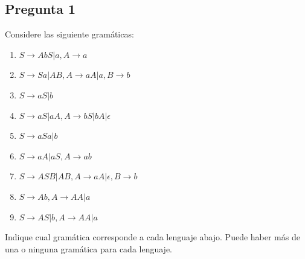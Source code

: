 \documentclass{article}
\begin{document}
	\subsection{Pregunta 1}
	Considere las siguiente gramáticas:
	
	\begin{multicols}{2}
        \begin{enumerate}
            \item $S \to AbS|a, A \to a$
            \item $S \to Sa|AB, A \to aA|a, B \to b$
            \item $S \to aS|b$
            \item $S \to aS|aA, A \to bS|bA|\epsilon$
            \item $S \to aSa|b$
            \item $S \to aA|aS, A \to ab$
            \item $S \to ASB|AB, A \to aA|\epsilon, B \to b$
            \item $S \to Ab, A \to AA|a$
            \item $S \to AS|b, A \to AA|a$
        \end{enumerate}
    \end{multicols}
    
    Indique cual gramática corresponde a cada lenguaje abajo. Puede haber más de una o ninguna gramática para cada lenguaje.
    
\end{document}
